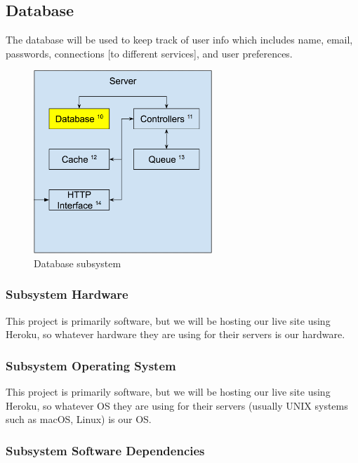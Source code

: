 \subsection{Database}
The database will be used to keep track of user info which includes name, email, passwords, connections [to different services], and user preferences.

\begin{figure}[h!]
	\centering
 	\includegraphics[width=0.60\textwidth]{images/server/server_database.png}
 	\caption{Database subsystem}
\end{figure}

\newpage

\subsubsection{Subsystem Hardware}
This project is primarily software, but we will be hosting our live site using Heroku, so whatever hardware they are using for their servers is our hardware. \\

\subsubsection{Subsystem Operating System}
This project is primarily software, but we will be hosting our live site using Heroku, so whatever OS they are using for their servers (usually UNIX systems such as macOS, Linux) is our OS. \\

\subsubsection{Subsystem Software Dependencies}

